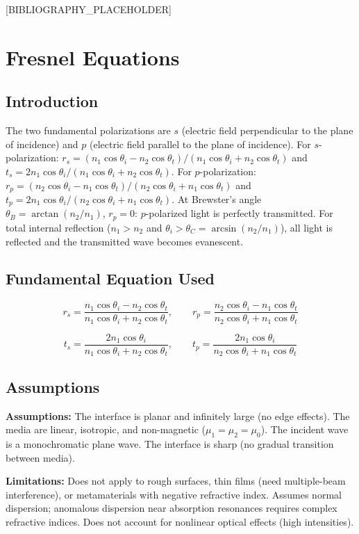 \documentclass[11pt,openright]{book}
\begin{document}
[BIBLIOGRAPHY_PLACEHOLDER]


\chapter{Fresnel Equations}

\section*{Introduction}

The two fundamental polarizations are $s$ (electric field perpendicular to the plane of incidence) and $p$ (electric field parallel to the plane of incidence). For $s$-polarization: $r_s = (n_1\cos\theta_i - n_2\cos\theta_t)/(n_1\cos\theta_i + n_2\cos\theta_t)$ and $t_s = 2n_1\cos\theta_i/(n_1\cos\theta_i + n_2\cos\theta_t)$. For $p$-polarization: $r_p = (n_2\cos\theta_i - n_1\cos\theta_t)/(n_2\cos\theta_i + n_1\cos\theta_t)$ and $t_p = 2n_1\cos\theta_i/(n_2\cos\theta_i + n_1\cos\theta_t)$. At Brewster's angle $\theta_B = \arctan(n_2/n_1)$, $r_p = 0$: $p$-polarized light is perfectly transmitted. For total internal reflection ($n_1 > n_2$ and $\theta_i > \theta_C = \arcsin(n_2/n_1)$), all light is reflected and the transmitted wave becomes evanescent.
\section*{Fundamental Equation Used}

\[
r_s = \frac{n_1\cos\theta_i - n_2\cos\theta_t}{n_1\cos\theta_i + n_2\cos\theta_t},\qquad r_p = \frac{n_2\cos\theta_i - n_1\cos\theta_t}{n_2\cos\theta_i + n_1\cos\theta_t}
\]

\[
t_s = \frac{2n_1\cos\theta_i}{n_1\cos\theta_i + n_2\cos\theta_t},\qquad t_p = \frac{2n_1\cos\theta_i}{n_2\cos\theta_i + n_1\cos\theta_t}
\]
\section*{Assumptions}

\textbf{Assumptions:} The interface is planar and infinitely large (no edge effects). The media are linear, isotropic, and non-magnetic ($\mu_1 = \mu_2 = \mu_0$). The incident wave is a monochromatic plane wave. The interface is sharp (no gradual transition between media).


\textbf{Limitations:} Does not apply to rough surfaces, thin films (need multiple-beam interference), or metamaterials with negative refractive index. Assumes normal dispersion; anomalous dispersion near absorption resonances requires complex refractive indices. Does not account for nonlinear optical effects (high intensities).
\end{document}
